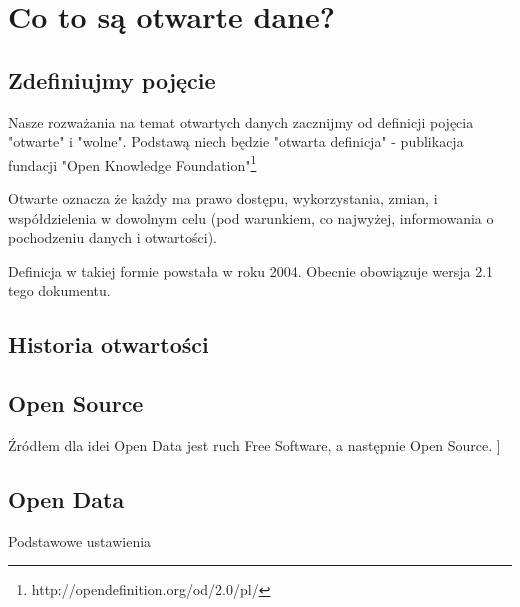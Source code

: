 \chapter{Co to są otwarte dane?}
\section{Zdefiniujmy pojęcie}
Nasze rozważania na temat otwartych danych zacznijmy od definicji pojęcia "otwarte" i "wolne". Podstawą niech będzie "otwarta definicja" - publikacja fundacji "Open Knowledge Foundation"\footnote{http://opendefinition.org/od/2.0/pl/}
\begin{mdframed}[backgroundcolor=code-gray]
Otwarte oznacza że każdy ma prawo dostępu, wykorzystania, zmian, i współdzielenia w dowolnym celu (pod warunkiem, co najwyżej, informowania o pochodzeniu danych i otwartości).
\end{mdframed}
Definicja w takiej formie powstała w roku 2004. Obecnie obowiązuje wersja 2.1 tego dokumentu. 

\section{Historia otwartości}
\section{Open Source}

Źródłem dla idei Open Data jest ruch Free Software, a następnie Open Source. ]
\section{Open Data}
	Podstawowe ustawienia	 


